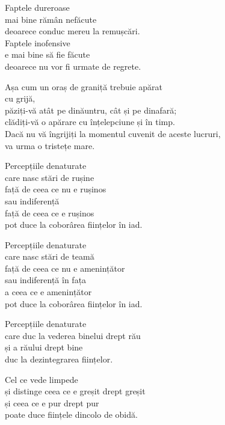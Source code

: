 Faptele dureroase\\
mai bine rămân nefăcute\\
deoarece conduc mereu la remușcări.\\
Faptele inofensive\\
e mai bine să fie făcute\\
deoarece nu vor fi urmate de regrete.


Așa cum un oraș de graniță trebuie apărat\\
cu grijă,\\
păziți-vă atât pe dinăuntru, cât și pe dinafară;\\
clădiți-vă o apărare cu înțelepciune și în timp.\\
Dacă nu vă îngrijiți la momentul cuvenit de aceste lucruri,\\
va urma o tristețe mare.


Percepțiile denaturate\\
care nasc stări de rușine\\
față de ceea ce nu e rușinos\\
sau indiferență\\
față de ceea ce e rușinos\\
pot duce la coborârea ființelor în iad.


Percepțiile denaturate\\
care nasc stări de teamă\\
față de ceea ce nu e amenințător\\
sau indiferență în fața\\
a ceea ce e amenințător\\
pot duce la coborârea ființelor în iad.


Percepțiile denaturate\\
care duc la vederea binelui drept rău\\
și a răului drept bine\\
duc la dezintegrarea ființelor.


Cel ce vede limpede\\
și distinge ceea ce e greșit drept greșit\\
și ceea ce e pur drept pur\\
poate duce ființele dincolo de obidă.
